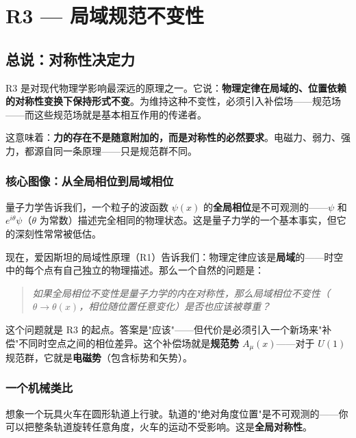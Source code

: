 \chapter{R3 — 局域规范不变性}
\label{ch:r3}

\section{总说：对称性决定力}

R3 是对现代物理学影响最深远的原理之一。它说：\textbf{物理定律在局域的、位置依赖的对称性变换下保持形式不变}。为维持这种不变性，必须引入补偿场——规范场——而这些规范场就是基本相互作用的传递者。

这意味着：\textbf{力的存在不是随意附加的，而是对称性的必然要求}。电磁力、弱力、强力，都源自同一条原理——只是规范群不同。

\subsection{核心图像：从全局相位到局域相位}

量子力学告诉我们，一个粒子的波函数 $\psi(x)$ 的\textbf{全局相位}是不可观测的——$\psi$ 和 $e^{i\theta}\psi$（$\theta$ 为常数）描述完全相同的物理状态。这是量子力学的一个基本事实，但它的深刻性常常被低估。

现在，爱因斯坦的局域性原理（R1）告诉我们：物理定律应该是\textbf{局域}的——时空中的每个点有自己独立的物理描述。那么一个自然的问题是：

\begin{quote}
\textit{如果全局相位不变性是量子力学的内在对称性，那么局域相位不变性（$\theta \to \theta(x)$，相位随位置任意变化）是否也应该被尊重？}
\end{quote}

这个问题就是 R3 的起点。答案是"应该"——但代价是必须引入一个新场来"补偿"不同时空点之间的相位差异。这个补偿场就是\textbf{规范势} $A_\mu(x)$——对于 $U(1)$ 规范群，它就是\textbf{电磁势}（包含标势和矢势）。

\subsection{一个机械类比}

想象一个玩具火车在圆形轨道上行驶。轨道的"绝对角度位置"是不可观测的——你可以把整条轨道旋转任意角度，火车的运动不受影响。这是\textbf{全局对称性}。


